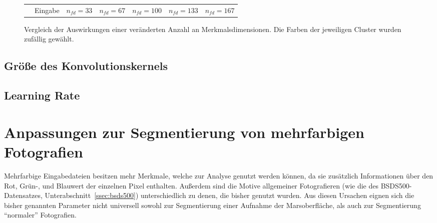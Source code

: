 \begin{figure}[h!]
\begin{tabular}{m{15pt}m{}m{}m{}m{}m{}m{}}
		&
		\vspace*{2pt}\centering Eingabe & 
		\vspace*{2pt}\centering $n_{fd}=33$ &
		\vspace*{2pt}\centering $n_{fd}=67$ &
		\vspace*{2pt}\centering $n_{fd}=100$ &
		\vspace*{2pt}\centering $n_{fd}=133$ &
		\vspace*{2pt}\centering $n_{fd}=167$ \\
	\end{tabular}
	\caption{Vergleich der Auswirkungen einer veränderten Anzahl an Merkmalsdimensionen. Die Farben der jeweiligen Cluster wurden zufällig gewählt.}
	\label{fig:fd_comparision}
\end{figure}

\subsection{Größe des Konvolutionskernels}
\subsection{Learning Rate}


\fi
\section{Anpassungen zur Segmentierung von mehrfarbigen Fotografien}
\label{sec:color_picture_optimization}

Mehrfarbige Eingabedateien besitzen mehr Merkmale, welche zur Analyse genutzt werden können, da sie zusätzlich Informationen über den Rot, Grün-, und Blauwert der einzelnen Pixel enthalten. Außerdem sind die Motive allgemeiner Fotografieren (wie \zB die des BSDS500-Datensatzes, \vgl Unterabschnitt~\ref{ssec:bsds500}) unterschiedlich zu denen, die bisher genutzt wurden.
Aus diesen Ursachen eignen sich die bisher genannten Parameter nicht universell sowohl zur Segmentierung einer Aufnahme der Marsoberfläche, als auch zur Segmentierung \enquote{normaler} Fotografien.